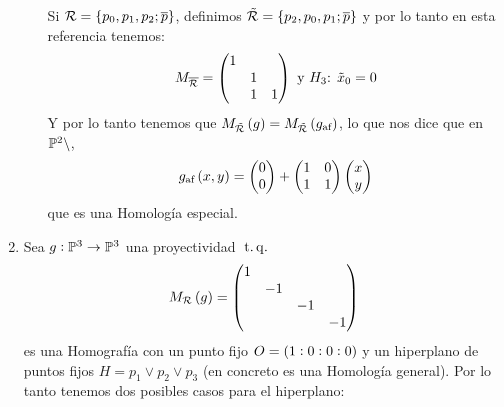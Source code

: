 \begin{example}
\begin{enumerate}
\begin{enumerate}
                    Si $\mathcal{R} = \{p_0, p_1, p_2; \overline{p} \}$, definimos $\tilde{\mathcal{R}}=\{p_2, p_0, p_1; \overline{p} \}$ y por lo tanto en esta referencia tenemos:
                    \[
                        M_{\overline{\mathcal{R}}} =
                        \begin{pmatrix}
                        1 & & \\
                         & 1 & \\
                         & 1 & 1 \\
                        \end{pmatrix} \text{ y }
                        H_3\text{: }\tilde{x}_0 = 0
                    \]
                    Y por lo tanto tenemos que $M_{\tilde{\mathcal{R}}}\left( g\right) = M_{\tilde{\mathcal{R}}}\left( g_\text{af} \right)$, lo que nos dice que en $\mathbb{P}^2\setminus$,
                    \[
                    g_\text{af}\left( x,y\right) = 
                    \begin{pmatrix}
                    0\\
                    0\\
                    \end{pmatrix} +
                    \begin{pmatrix}
                    1 & 0\\
                    1 & 1\\
                    \end{pmatrix}
                    \begin{pmatrix}
                    x\\
                    y\\
                    \end{pmatrix}
                    \]
                    que es una Homología especial.
            \end{enumerate}
            \item Sea $g: \mathbb{P}^3 \to \mathbb{P}^3$ una proyectividad $\operatorname{\;t.q.\;}$
            \[
            M_{\mathcal{R}} \left( g \right) =
            \begin{pmatrix}
                    1 & & &\\
                    & -1 & &\\
                    & & -1 &\\
                    & & & -1\\
            \end{pmatrix}
            \]
            es una Homografía con un punto fijo $O=\left( 1:0:0:0\right)$ y un hiperplano de puntos fijos $H= p_1 \vee p_2 \vee p_3$ (en concreto es una Homología general). Por lo tanto tenemos dos posibles casos para el hiperplano:

\end{enumerate}
\end{example}
